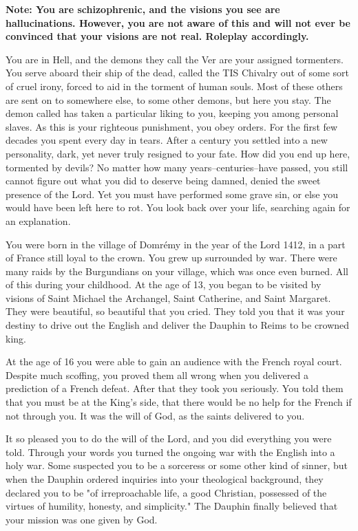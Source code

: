 \documentclass[char]{guildcamp4}
\begin{document}
\name{\cJoan{}}


{\bf Note: You are schizophrenic, and the visions you see are hallucinations. However, you are not aware of this and will not ever be convinced that your visions are not real. Roleplay accordingly.}

You are in Hell, and the demons they call the Ver are your assigned tormenters. You serve aboard their ship of the dead, called the TIS Chivalry out of some sort of cruel irony, forced to aid in the torment of human souls. Most of these others are sent on to somewhere else, to some other demons, but here you stay. The demon called \cVone{} has taken a particular liking to you, keeping you among \cVone{\their} personal slaves. As this is your righteous punishment, you obey \cVone{\their} orders. For the first few decades you spent every day in tears. After a century you settled into a new personality, dark, yet never truly resigned to your fate. How did you end up here, tormented by devils? No matter how many years--centuries--have passed, you still cannot figure out what you did to deserve being damned, denied the sweet presence of the Lord. Yet you must have performed some grave sin, or else you would have been left here to rot. You look back over your life, searching again for an explanation.

You were born in the village of Domr\'{e}my in the year of the Lord 1412, in a part of France still loyal to the crown. You grew up surrounded by war. There were many raids by the Burgundians on your village, which was once even burned. All of this during your childhood. At the age of 13, you began to be visited by visions of Saint Michael the Archangel, Saint Catherine, and Saint Margaret. They were beautiful, so beautiful that you cried. They told you that it was your destiny to drive out the English and deliver the Dauphin to Reims to be crowned king. 

At the age of 16 you were able to gain an audience with the French royal court. Despite much scoffing, you proved them all wrong when you delivered a prediction of a French defeat. After that they took you seriously. You told them that you must be at the King's side, that there would be no help for the French if not through you. It was the will of God, as the saints delivered to you.

It so pleased you to do the will of the Lord, and you did everything you were told. Through your words you turned the ongoing war with the English into a holy war. Some suspected you to be a sorceress or some other kind of sinner, but when the Dauphin ordered inquiries into your theological background, they declared you to be "of irreproachable life, a good Christian, possessed of the virtues of humility, honesty, and simplicity." The Dauphin finally believed that your mission was one given by God.
\end{document}
